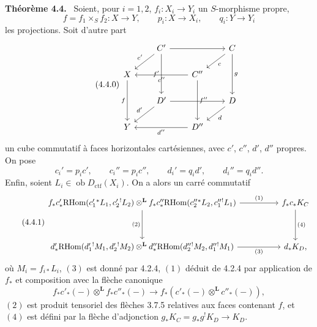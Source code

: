 \documentclass[11pt]{article}
\newenvironment{statement}[1]{\par\medskip\noindent\textbf{#1.}\ }{\par\medskip}
\newcommand{\ob}{\operatorname{ob}}
\providecommand{\RHom}{\mathrm{RHom}}
\providecommand{\Dctf}{D_{\mathrm{ctf}}}
\providecommand{\Dctf}{D_{\mathrm{ctf}}}
\providecommand{\RHom}{\mathrm{RHom}}
\providecommand{\ob}{\operatorname{ob}}
\begin{document}
\begin{statement}{Théorème 4.4}
Soient, pour $i=1,2$, $f_i:X_i\longrightarrow Y_i$ un $S$-morphisme propre,
\[
f=f_1\times_S f_2:X\longrightarrow Y,\qquad
p_i:X\longrightarrow X_i,\qquad q_i:Y\longrightarrow Y_i
\]
les projections. Soit d'autre part
\begin{equation}
\tag{4.4.0}
\begin{tikzcd}[column sep=2.1em,row sep=1.6em]
& C' \arrow[rr] \arrow[dl,"c'"'] \arrow[dd,"f'"'] && C \arrow[dl,"c"] \arrow[dd,"g"] \\
X \arrow[dd,"f"'] && C'' \arrow[ll,"c''"] \arrow[dd,"f''"] \\
& D' \arrow[rr] \arrow[dl,"d'"'] && D \arrow[dl,"d"] \\
Y && D'' \arrow[ll,"d''"]
\end{tikzcd}
\end{equation}
un cube commutatif à faces horizontales cartésiennes, avec $c'$, $c''$, $d'$, $d''$ propres. On pose
\[
c_i'=p_i c',\qquad c_i''=p_i c'',\qquad d_i'=q_i d',\qquad d_i''=q_i d''.
\]
Enfin, soient $L_i\in\ob \Dctf(X_i)$. On a alors un carré commutatif
\begin{equation}
\tag{4.4.1}
\begin{tikzcd}[column sep=huge,row sep=huge]
f_*c'_*\RHom(c_1'{}^*L_1,c_2'{}^!L_2)\otimes^{\mathbf L}
f_*c''_*\RHom(c_2''{}^*L_2,c_1''{}^!L_1)
 \arrow[r,"(1)"] \arrow[d,"(2)"'] &
f_*c_*K_C \arrow[d,"(4)"] \\
d'_*\RHom(d_1'{}^!M_1,d_2'{}^!M_2)\otimes^{\mathbf L}
d''_*\RHom(d_2''{}^!M_2,d_1''{}^!M_1)
 \arrow[r,"(3)"'] &
d_*K_D ,
\end{tikzcd}
\end{equation}
où $M_i=f_{i*}L_i$, $(3)$ est donné par 4.2.4, $(1)$ déduit de 4.2.4 par application de $f_*$ et composition avec la flèche canonique
\[
f_*c'_*(-)\otimes^{\mathbf L} f_*c''_*(-)\longrightarrow f_*(c'_*(-)\otimes^{\mathbf L}c''_*(-)),
\]
$(2)$ est produit tensoriel des flèches 3.7.5 relatives aux faces contenant $f$, et $(4)$ est défini par la flèche d'adjonction $g_*K_C=g_*g^!K_D\longrightarrow K_D$.
\end{statement}
\end{document}
